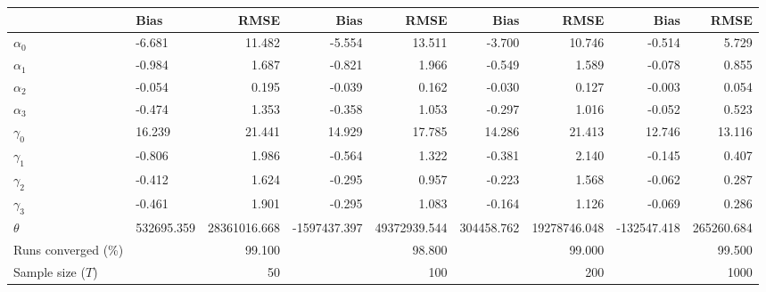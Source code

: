 
\begin{tabular}[t]{llrrrrrrr}
\toprule
  & Bias & RMSE & Bias & RMSE & Bias & RMSE & Bias & RMSE\\
\midrule
$\alpha_{0}$ & -6.681 & 11.482 & -5.554 & 13.511 & -3.700 & 10.746 & -0.514 & 5.729\\
$\alpha_{1}$ & -0.984 & 1.687 & -0.821 & 1.966 & -0.549 & 1.589 & -0.078 & 0.855\\
$\alpha_{2}$ & -0.054 & 0.195 & -0.039 & 0.162 & -0.030 & 0.127 & -0.003 & 0.054\\
$\alpha_{3}$ & -0.474 & 1.353 & -0.358 & 1.053 & -0.297 & 1.016 & -0.052 & 0.523\\
$\gamma_{0}$ & 16.239 & 21.441 & 14.929 & 17.785 & 14.286 & 21.413 & 12.746 & 13.116\\
$\gamma_{1}$ & -0.806 & 1.986 & -0.564 & 1.322 & -0.381 & 2.140 & -0.145 & 0.407\\
$\gamma_{2}$ & -0.412 & 1.624 & -0.295 & 0.957 & -0.223 & 1.568 & -0.062 & 0.287\\
$\gamma_{3}$ & -0.461 & 1.901 & -0.295 & 1.083 & -0.164 & 1.126 & -0.069 & 0.286\\
$\theta$ & 532695.359 & 28361016.668 & -1597437.397 & 49372939.544 & 304458.762 & 19278746.048 & -132547.418 & 265260.684\\
Runs converged (\%) &  & 99.100 &  & 98.800 &  & 99.000 &  & 99.500\\
Sample size ($T$) &  & 50 &  & 100 &  & 200 &  & 1000\\
\bottomrule
\end{tabular}
